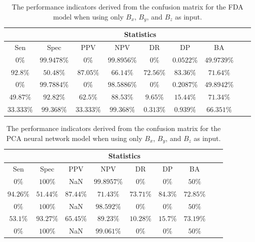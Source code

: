 \begin{table}[!ht]
	\centering
	\begin{tabular}{|c|c|c|c|c|c|c|c|c|}
		\hline
		 & \multicolumn{7}{c|}{Statistics} \\ \hline
		Sen & Spec & PPV & NPV & DR & DP & BA \\ \hline
		$0\%$ & $99.9478\%$ & $0\%$ & $99.8956\%$ & $0\%$ & $0.0522\%$ & $49.9739\%$ \\ \hline
		$92.8\%$ & $50.48\%$ & $87.05\%$ & $66.14\%$ & $72.56\%$ & $83.36\%$ & $71.64\%$ \\ \hline
		$0\%$ & $99.7884\%$ & $0\%$ & $98.5886\%$ & $0\%$ & $0.2087\%$ & $49.8942\%$ \\ \hline
		$49.87\%$ & $92.82\%$ & $62.5\%$ & $88.53\%$ & $9.65\%$ & $15.44\%$ & $71.34\%$ \\ \hline
		$33.333\%$ & $99.368\%$ & $33.333\%$ & $99.368\%$ & $0.313\%$ & $0.939\%$ & $66.351\%$ \\ \hline
	\end{tabular}
	\caption{The performance indicators derived from the confusion matrix for the FDA model when using only $B_{x}$, $B_{y}$, and $B_{z}$ as input.}
	\label{tab:cs:coord:fda}
\end{table}

\begin{table}[!ht]
	\centering
	\begin{tabular}{|c|c|c|c|c|c|c|c|c|}
		\hline
		 & \multicolumn{7}{c|}{Statistics} \\ \hline
		Sen & Spec & PPV & NPV & DR & DP & BA \\ \hline
		$0\%$ & $100\%$ & NaN & $99.8957\%$ & $0\%$ & $0\%$ & $50\%$ \\ \hline
		$94.26\%$ & $51.44\%$ & $87.44\%$ & $71.43\%$ & $73.71\%$ & $84.3\%$ & $72.85\%$ \\ \hline
		$0\%$ & $100\%$ & NaN & $98.592\%$ & $0\%$ & $0\%$ & $50\%$ \\ \hline
		$53.1\%$ & $93.27\%$ & $65.45\%$ & $89.23\%$ & $10.28\%$ & $15.7\%$ & $73.19\%$ \\ \hline
		$0\%$ & $100\%$ & NaN & $99.061\%$ & $0\%$ & $0\%$ & $50\%$ \\ \hline
	\end{tabular}
	\caption{The performance indicators derived from the confusion matrix for the PCA neural network model when using only $B_{x}$, $B_{y}$, and $B_{z}$ as input.}
	\label{tab:cs:coord:pcaNNet}
\end{table}

